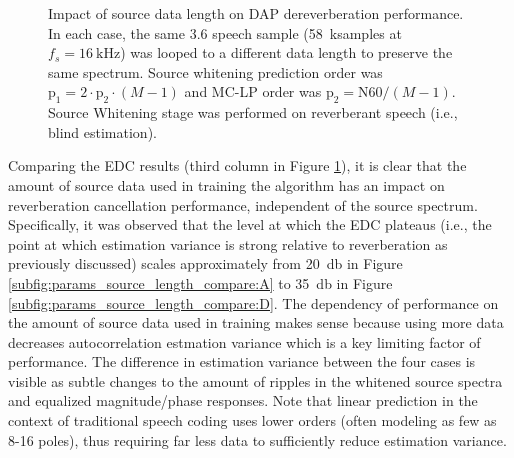 \begin{figure}[H]
	\caption[Impact of source data length on DAP dereverberation performance]{Impact of source data length on DAP dereverberation performance. In each case, the same \qty{3.6}{\sec} speech sample (\qty{58}{\kilo samples} at $f_s=\qty{16}{\kilo\hertz}$) was looped to a different data length to preserve the same spectrum. Source whitening prediction order was $\mathrm{p_1} = 2 \cdot \mathrm{p_2} \cdot (M-1)$ and MC-LP order was $\mathrm{p_2} = \mathrm{N60} / (M-1)$. Source Whitening stage was performed on reverberant speech (i.e., blind estimation).}
	\label{fig:params_source_length_compare}
	
\end{figure}

Comparing the EDC results (third column in Figure \ref{fig:params_source_length_compare}), it is clear that the amount of source data used in training the algorithm has an impact on reverberation cancellation performance, independent of the source spectrum. Specifically, it was observed that the level at which the EDC plateaus (i.e., the point at which estimation variance is strong relative to reverberation as previously discussed) scales approximately from \qty{20}{\decibel} in Figure \ref{subfig:params_source_length_compare:A} to \qty{35}{\decibel} in Figure \ref{subfig:params_source_length_compare:D}. The dependency of performance on the amount of source data used in training makes sense because using more data decreases autocorrelation estmation variance which is a key limiting factor of performance. The difference in estimation variance  between the four cases is visible as subtle changes to the amount of ripples in the whitened source spectra and equalized magnitude/phase responses. Note that linear prediction in the context of traditional speech coding uses lower orders (often modeling as few as 8-16 poles), thus requiring far less data to sufficiently reduce estimation variance. 



